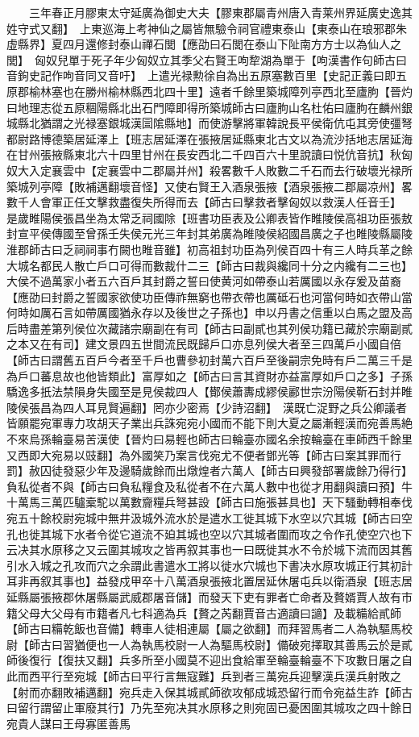 　　三年春正月膠東太守延廣為御史大夫【膠東郡屬青州唐入青莱州界延廣史逸其姓守式又翻】　上東巡海上考神仙之屬皆無驗令祠官禮東泰山【東泰山在琅邪郡朱虛縣界】夏四月還修封泰山禪石閭【應劭曰石閭在泰山下阯南方方士以為仙人之閭】　匈奴兒單于死子年少匈奴立其季父右賢王呴犂湖為單于【呴漢書作句師古曰音鉤史記作呴音同又音吁】　上遣光禄勲徐自為出五原塞數百里【史記正義曰即五原郡榆林塞也在勝州榆林縣西北四十里】遠者千餘里築城障列亭西北至廬朐【晉灼曰地理志從五原稒陽縣北出石門障即得所築城師古曰廬朐山名杜佑曰廬朐在麟州銀城縣北猶謂之光禄塞銀城漢圁隂縣地】而使游擊將軍韓說長平侯衛伉屯其旁使彊弩都尉路博德築居延澤上【班志居延澤在張掖居延縣東北古文以為流沙括地志居延海在甘州張掖縣東北六十四里甘州在長安西北二千四百六十里說讀曰悦伉音抗】秋匈奴大入定襄雲中【定襄雲中二郡屬并州】殺畧數千人敗數二千石而去行破壞光禄所築城列亭障【敗補邁翻壞音怪】又使右賢王入酒泉張掖【酒泉張掖二郡屬凉州】畧數千人會軍正任文擊救盡復失所得而去【師古曰擊救者擊匈奴以救漢人任音壬】　是歲睢陽侯張昌坐為太常乏祠國除【班書功臣表及公卿表皆作睢陵侯高祖功臣張敖封宣平侯傳國至曾孫壬失侯元光三年封其弟廣為睢陵侯紹國昌廣之子也睢陵縣屬陵淮郡師古曰乏祠祠事冇闕也睢音雖】初高祖封功臣為列侯百四十有三人時兵革之餘大城名都民人散亡戶口可得而數裁什二三【師古曰裁與纔同十分之内纔有二三也】大侯不過萬家小者五六百戶其封爵之誓曰使黄河如帶泰山若厲國以永存爰及苗裔【應劭曰封爵之誓國家欲使功臣傳祚無窮也帶衣帶也厲砥石也河當何時如衣帶山當何時如厲石言如帶厲國猶永存以及後世之子孫也】申以丹書之信重以白馬之盟及高后時盡差第列侯位次藏諸宗廟副在有司【師古曰副貳也其列侯功籍已藏於宗廟副貳之本又在有司】建文景四五世間流民既歸戶口亦息列侯大者至三四萬戶小國自倍【師古曰謂舊五百戶今者至千戶也曹參初封萬六百戶至後嗣宗免時有戶二萬三千是為戶口蕃息故也他皆類此】富厚如之【師古曰言其資財亦益富厚如戶口之多】子孫驕逸多扺法禁隕身失國至是見侯裁四人【鄼侯蕭夀成繆侯酈世宗汾陽侯靳石封并睢陵侯張昌為四人耳見賢遍翻】罔亦少密焉【少詩沼翻】　漢既亡浞野之兵公卿議者皆願罷宛軍專力攻胡天子業出兵誅宛宛小國而不能下則大夏之屬漸輕漢而宛善馬絶不來烏孫輪臺易苦漢使【晉灼曰易輕也師古曰輪臺亦國名余按輪臺在車師西千餘里又西即大宛易以豉翻】為外國笑乃案言伐宛尤不便者鄧光等【師古曰案其罪而行罰】赦囚徒發惡少年及邊騎歲餘而出燉煌者六萬人【師古曰興發部署歲餘乃得行】負私從者不與【師古曰負私糧食及私從者不在六萬人數中也從才用翻與讀曰預】牛十萬馬三萬匹驢槖駝以萬數齎糧兵弩甚設【師古曰施張甚具也】天下騷動轉相奉伐宛五十餘校尉宛城中無井汲城外流水於是遣水工徙其城下水空以穴其城【師古曰空孔也徙其城下水者令從它道流不廹其城也空以穴其城者圍而攻之令作孔使空穴也下云决其水原移之又云圍其城攻之皆再叙其事也一曰既徙其水不令於城下流而因其舊引水入城之孔攻而穴之余謂此書遣水工將以徙水穴城也下書决水原攻城正行其初計耳非再叙其事也】益發戍甲卒十八萬酒泉張掖北置居延休屠屯兵以衛酒泉【班志居延縣屬張掖郡休屠縣屬武威郡屠音儲】而發天下吏有罪者亡命者及贅婿賈人故有市籍父母大父母有市籍者凡七科適為兵【贅之芮翻賈音古適讀曰讁】及載糒給貳師【師古曰糒乾飯也音備】轉車人徒相連屬【屬之欲翻】而拜習馬者二人為執驅馬校尉【師古曰習猶便也一人為執馬校尉一人為驅馬校尉】備破宛擇取其善馬云於是貳師後復行【復扶又翻】兵多所至小國莫不迎出食給軍至輪臺輪臺不下攻數日屠之自此而西平行至宛城【師古曰平行言無寇難】兵到者三萬宛兵迎擊漢兵漢兵射敗之【射而亦翻敗補邁翻】宛兵走入保其城貳師欲攻郁成城恐留行而令宛益生詐【師古曰留行謂留止軍廢其行】乃先至宛决其水原移之則宛固已憂困圍其城攻之四十餘日宛貴人謀曰王母寡匿善馬
